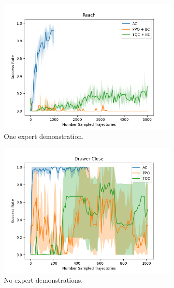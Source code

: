 \begin{figure}[htbp]
  \centering
  \begin{subfigure}[t]{0.45\textwidth}
    \includegraphics[width=\textwidth]{images/dense_1/Reach.png}
    \caption{One expert demonstration.}
  \end{subfigure}
  \hfill
  \begin{subfigure}[t]{0.45\textwidth}
    \includegraphics[width=\textwidth]{images/dense_0/Drawer Close.png}
    \caption{No expert demonstrations.}
  \end{subfigure}
  \medskip
  \begin{subfigure}[t]{0.45\textwidth}

\end{subfigure}
\end{figure}

